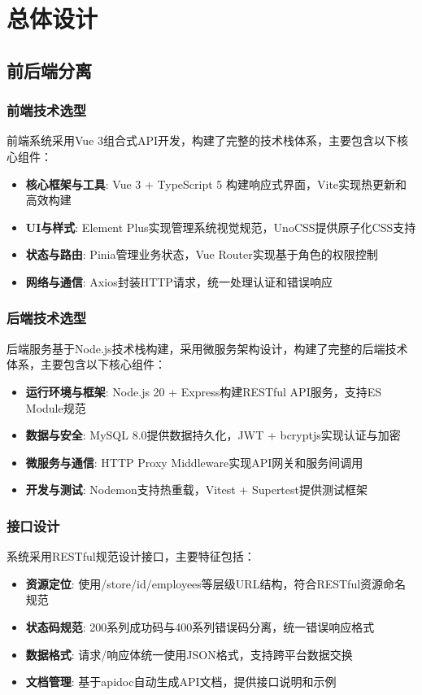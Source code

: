 \documentclass{ctexart}
\begin{document}
\section{总体设计}
\subsection{前后端分离}
\subsubsection{前端技术选型}
前端系统采用Vue 3组合式API开发，构建了完整的技术栈体系，主要包含以下核心组件：
\begin{itemize}
    \item \textbf{核心框架与工具}: Vue 3 + TypeScript 5 构建响应式界面，Vite实现热更新和高效构建
    \item \textbf{UI与样式}: Element Plus实现管理系统视觉规范，UnoCSS提供原子化CSS支持
    \item \textbf{状态与路由}: Pinia管理业务状态，Vue Router实现基于角色的权限控制
    \item \textbf{网络与通信}: Axios封装HTTP请求，统一处理认证和错误响应
\end{itemize}

\subsubsection{后端技术选型}
后端服务基于Node.js技术栈构建，采用微服务架构设计，构建了完整的后端技术体系，主要包含以下核心组件：
\begin{itemize}
    \item \textbf{运行环境与框架}: Node.js 20 + Express构建RESTful API服务，支持ES Module规范
    \item \textbf{数据与安全}: MySQL 8.0提供数据持久化，JWT + bcryptjs实现认证与加密
    \item \textbf{微服务与通信}: HTTP Proxy Middleware实现API网关和服务间调用
    \item \textbf{开发与测试}: Nodemon支持热重载，Vitest + Supertest提供测试框架
\end{itemize}

\subsubsection{接口设计}
系统采用RESTful规范设计接口，主要特征包括：
\begin{itemize}
    \item \textbf{资源定位}: 使用/store/{id}/employees等层级URL结构，符合RESTful资源命名规范
    \item \textbf{状态码规范}: 200系列成功码与400系列错误码分离，统一错误响应格式
    \item \textbf{数据格式}: 请求/响应体统一使用JSON格式，支持跨平台数据交换
    \item \textbf{文档管理}: 基于apidoc自动生成API文档，提供接口说明和示例
\end{itemize}
\end{document}
